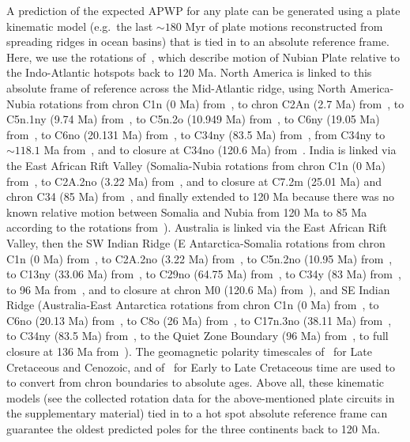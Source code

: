 A prediction of the expected APWP for any plate can be generated using a plate
kinematic model (e.g.\ the last ${\sim}180$ Myr of plate motions
reconstructed from spreading ridges in ocean basins) that is tied in to an
absolute reference frame. Here, we use the rotations of~\citet{O05}, which
describe motion of Nubian Plate relative to the Indo-Atlantic hotspots back to
120 Ma. North America is
linked to this absolute frame of reference across the
Mid-Atlantic ridge, using North America-Nubia rotations from chron C1n
(0 Ma) from~\citet{D10}, to chron C2An (2.7 Ma)
from~\citet{Sh12}, to C5n.1ny (9.74 Ma) from~\citet{M99}, to C5n.2o
(10.949 Ma) from~\citet{G13}, to C6ny (19.05 Ma) from~\citet{M99}, to
C6no (20.131 Ma) from~\citet{G13}, to C34ny (83.5 Ma) from~\citet{M99}, from C34ny to
${\sim}118.1$ Ma from~\citet{S12}, and to closure at C34no (120.6 Ma)
from~\citet{G13}.
India is linked via the East African Rift Valley (Somalia-Nubia rotations from
chron C1n (0 Ma) from~\citet{D17}, to C2A.2no (3.22 Ma) from~\citet{H05},
and to closure at C7.2m (25.01 Ma) and chron C34 (85 Ma) from~\citet{R16}, and finally extended to 120 Ma because there was no known relative
motion between Somalia and Nubia from 120 Ma to 85 Ma according to the rotations
from~\citet{M16}). Australia is linked via the East African Rift Valley, then
the SW Indian
Ridge (E Antarctica-Somalia rotations from chron C1n (0 Ma) from~\citet{D17},
to C2A.2no (3.22 Ma) from~\citet{H05}, to C5n.2no (10.95 Ma)
from~\citet{L02}, to C13ny (33.06 Ma) from~\citet{P08}, to C29no
(64.75 Ma) from~\citet{C10}, to C34y (83 Ma) from~\citet{R16}, to 96
Ma from~\citet{M01}, and to closure at chron M0 (120.6 Ma) from~\citet{M08}), and SE
Indian Ridge (Australia-East Antarctica rotations from chron C1n (0 Ma)
from~\citet{D17}, to C6no (20.13 Ma) from~\citet{C04}, to C8o (26 Ma)
from~\citet{G18}, to C17n.3no (38.11 Ma) from~\citet{C04}, to C34ny (83.5
Ma) from~\citet{Wh13}, to the Quiet Zone Boundary (96 Ma) from~\citet{W07}, to
full closure at 136 Ma from~\citet{Wh13}). The geomagnetic polarity timescales of~\citet{C95} for Late Cretaceous
and Cenozoic, and of~\citet{Gr94} for Early to Late Cretaceous time are
used to to convert from chron boundaries to absolute ages. Above all, these kinematic models (see the
collected rotation data for the above-mentioned plate circuits in the
supplementary material) tied in to a hot spot absolute reference frame can
guarantee the oldest predicted poles for the three continents back to 120 Ma.

